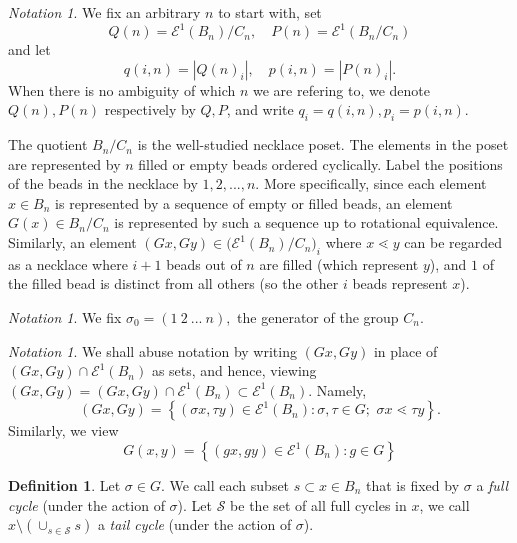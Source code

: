 \documentclass[10 pt]{amsart}
\theoremstyle{plain}
\theoremstyle{definition}
\newtheorem{defn}[thm]{Definition}
\theoremstyle{remark}
\newtheorem{note}[thm]{Notation}
\numberwithin{equation}{section}
\begin{document}
\begin{note} We fix an arbitrary $n$ to start with,  set $$Q(n) = \mathcal E^1 (B_n)/C_{n}, \quad P(n) = \mathcal E^1(B_n/C_{n})$$ and let $$q (i, n) =|Q(n)_i|, \quad p (i, n) =|P(n)_i|. $$  When there is no ambiguity of which $n$ we are refering to, we denote $Q(n), P(n)$ respectively by $Q, P$, and write $q_i = q(i, n), p_i = p (i, n)$.
\end{note}

The quotient $B_n /C_n$ is the well-studied necklace poset. The elements in the poset are represented by $n$ filled or empty beads ordered cyclically. Label the positions of the beads in the necklace by $1, 2, ..., n$. More specifically, since each element $x \in B_n$ is represented by a sequence of empty or filled beads, an element $G(x) \in B_n/C_n$ is represented by such a sequence up to rotational equivalence.  Similarly, an element $(Gx, Gy) \in \big(\mathcal E^1(B_n)/C_n\big)_{i}$ where $x \lessdot y$ can be regarded as a necklace where $i+1$ beads out of $n$ are filled (which represent $y$), and $1$ of the filled bead is distinct from all others (so the other $i$ beads represent $x$).
 
\begin{note}
We fix $\sigma_0 = (1 \: 2 \: ... \: n),$ the generator of the group $C_n$.
\end{note}


\begin{note}
We shall abuse notation by writing $(Gx, Gy)$ in place of $(Gx, Gy) \cap \mathcal E^1(B_n)$ as sets, and hence, viewing $(Gx, Gy) = (Gx, Gy) \cap \mathcal E^1(B_n)\subset \mathcal E^1(B_n).$ Namely, $$(Gx, Gy) = \left\{ (\sigma x, \tau y) \in \mathcal E^1 (B_n) : \sigma, \tau \in G; \, \, \sigma x \lessdot \tau y  \right\}.$$ Similarly, we view $$G(x, y) = \left\{ (gx , g y) \in \mathcal E^1 (B_n) : g \in G \right\} $$
\end{note}

\begin{defn}
Let  $\sigma \in G.$ We call each subset $s \subset x \in B_n$ that is fixed by $\sigma$ a \textit{full cycle} (under the action of $\sigma$). Let $\mathcal S$ be the set of all full cycles in $x$, we call   $ x \setminus \left(\cup_{s \in \mathcal S}  s \right)$ a \textit{tail cycle} (under the action of $\sigma$).  
\end{defn}
\end{document}
